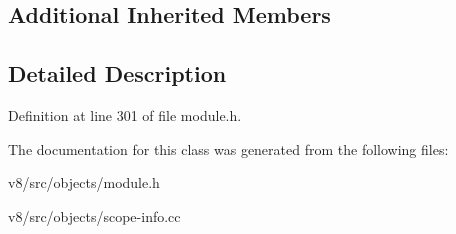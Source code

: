 \subsection*{Additional Inherited Members}


\subsection{Detailed Description}


Definition at line 301 of file module.\+h.



The documentation for this class was generated from the following files\+:\begin{DoxyCompactItemize}
\item 
v8/src/objects/module.\+h\item 
v8/src/objects/scope-\/info.\+cc\end{DoxyCompactItemize}
